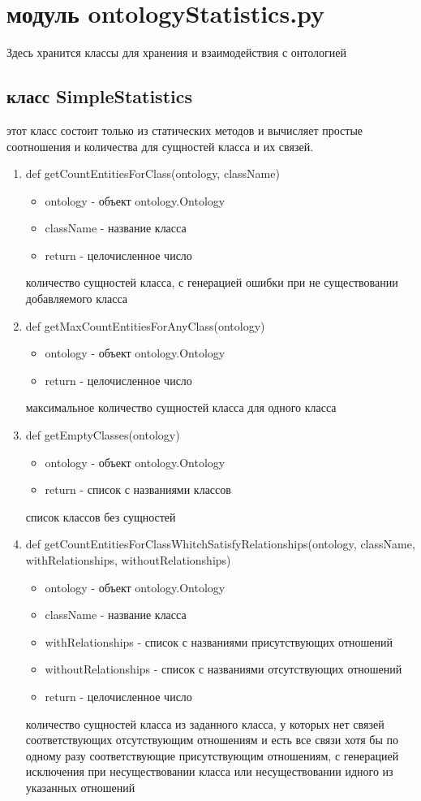 \documentclass{article}
\begin{document}
	\section{модуль ontologyStatistics.py}
	Здесь хранится классы для хранения и взаимодействия с онтологией
	
	\subsection{класс SimpleStatistics}
	этот класс состоит только из статических методов и вычисляет простые соотношения и количества для сущностей класса и их связей.
	\ \\
	
	\begin{enumerate}
		\item def getCountEntitiesForClass(ontology, className)
		\begin{itemize}
			\item ontology - объект ontology.Ontology
			\item className - название класса
			\item return - целочисленное число
		\end{itemize}
		количество сущностей класса, с генерацией ошибки при не существовании добавляемого класса
		
		\item def getMaxCountEntitiesForAnyClass(ontology)
		\begin{itemize}
			\item ontology - объект ontology.Ontology
			\item return - целочисленное число
		\end{itemize}
		максимальное количество сущностей класса для одного  класса
		
		\item def getEmptyClasses(ontology)
		\begin{itemize}
			\item ontology - объект ontology.Ontology
			\item return - список с названиями классов
		\end{itemize}
		список классов без сущностей
		
		\item def getCountEntitiesForClassWhitchSatisfyRelationships(ontology, className, withRelationships, withoutRelationships)
		\begin{itemize}
			\item ontology - объект ontology.Ontology
			\item className - название класса
			\item withRelationships - список с названиями присутствующих отношений
			\item withoutRelationships - список с названиями отсутствующих отношений
			\item return - целочисленное число
		\end{itemize}
		количество сущностей класса из заданного класса, у которых нет связей соответствующих отсутствующим отношениям и есть все связи хотя бы по одному разу соответствующие присутствующим отношениям, с генерацией исключения при несуществовании класса или несуществовании идного из указанных отношений
		

\end{enumerate}
\end{document}
